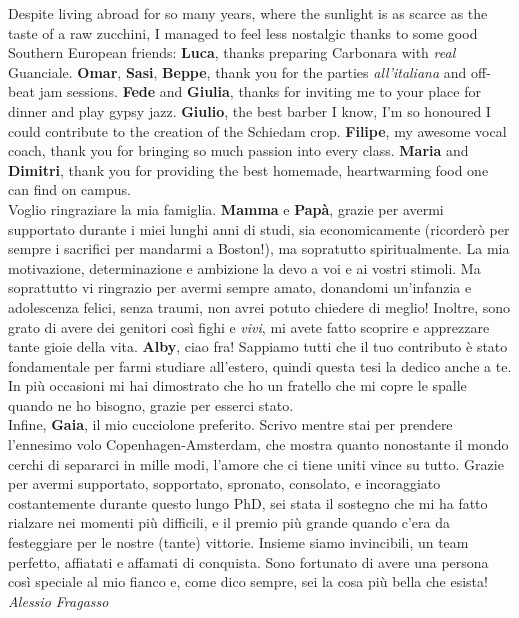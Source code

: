 \noindent Despite living abroad for so many years, where the sunlight is as scarce as the taste of a raw zucchini,  I managed to feel less nostalgic thanks to some good Southern European friends: \textbf{Luca}, thanks preparing Carbonara with \emph{real} Guanciale. \textbf{Omar}, \textbf{Sasi}, \textbf{Beppe}, thank you for the parties \emph{all'italiana} and off-beat jam sessions. \textbf{Fede} and \textbf{Giulia}, thanks for inviting me to your place for dinner and play gypsy jazz. \textbf{Giulio}, the best barber I know, I'm so honoured I could contribute to the creation of the Schiedam crop. \textbf{Filipe}, my awesome vocal coach, thank you for bringing so much passion into every class. \textbf{Maria} and \textbf{Dimitri}, thank you for providing the best homemade, heartwarming food one can find on campus. \\[0.5pt]

\noindent Voglio ringraziare la mia famiglia. \textbf{Mamma} e \textbf{Pap\`a}, grazie per avermi supportato durante i miei lunghi anni di studi, sia economicamente (ricorder\`o per sempre i sacrifici per mandarmi a Boston!), ma sopratutto spiritualmente. La mia motivazione, determinazione e ambizione la devo a voi e ai vostri stimoli. Ma soprattutto vi ringrazio per avermi sempre amato, donandomi un'infanzia e adolescenza felici, senza traumi, non avrei potuto chiedere di meglio! Inoltre, sono grato di avere dei genitori cos\`i fighi e \emph{vivi}, mi avete fatto scoprire e apprezzare tante gioie della vita. \textbf{Alby}, ciao fra! Sappiamo tutti che il tuo contributo \`e stato fondamentale per farmi studiare all'estero, quindi questa tesi la dedico anche a te. In pi\`u occasioni mi hai dimostrato che ho un fratello che mi copre le spalle quando ne ho bisogno, grazie per esserci stato. \\
Infine, \textbf{Gaia}, il mio cucciolone preferito. Scrivo mentre stai per prendere l'ennesimo volo Copenhagen-Amsterdam, che mostra quanto nonostante il mondo cerchi di separarci in mille modi, l'amore che ci tiene uniti vince su tutto. Grazie per avermi supportato, sopportato, spronato, consolato, e incoraggiato costantemente durante questo lungo PhD, sei stata il sostegno che mi ha fatto rialzare nei momenti pi\`u difficili, e il premio pi\`u grande quando c'era da festeggiare per le nostre (tante) vittorie. Insieme siamo invincibili, un team perfetto, affiatati e affamati di conquista. Sono fortunato di avere una persona cos\`i speciale al mio fianco e, come dico sempre, sei la cosa pi\`u bella che esista!\\

\hfill \emph{Alessio Fragasso}

